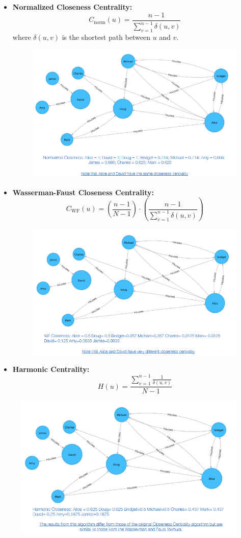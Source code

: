 \begin{itemize}
    \item \textbf{Normalized Closeness Centrality:}
    \[
    C_{\text{norm}}(u) = \frac{n-1}{\sum_{v=1}^{n-1} \delta(u,v)}
    \]
    where \( \delta(u,v) \) is the shortest path between \( u \) and \( v \).
    \begin{figure}[H]
        \centering
        \includegraphics[width=0.75\linewidth]{image.png}
    
    \end{figure}
    
    \item \textbf{Wasserman-Faust Closeness Centrality:}
    \[
    C_{\text{WF}}(u) = \left(\frac{n-1}{N-1}\right) \cdot \left(\frac{n-1}{\sum_{v=1}^{n-1} \delta(u,v)}\right)
    \]
\begin{figure}[H]
    \centering
    \includegraphics[width=0.75\linewidth]{wes and f closs cent.png}

\end{figure}

    \item \textbf{Harmonic Centrality:}
    \[
    H(u) = \frac{\sum_{v=1}^{n-1} \frac{1}{\delta(u,v)}}{N-1}
    \]
\end{itemize}
\begin{figure}[H]
    \centering
    \includegraphics[width=0.75\linewidth]{Harmonic cent.png}

\end{figure}


